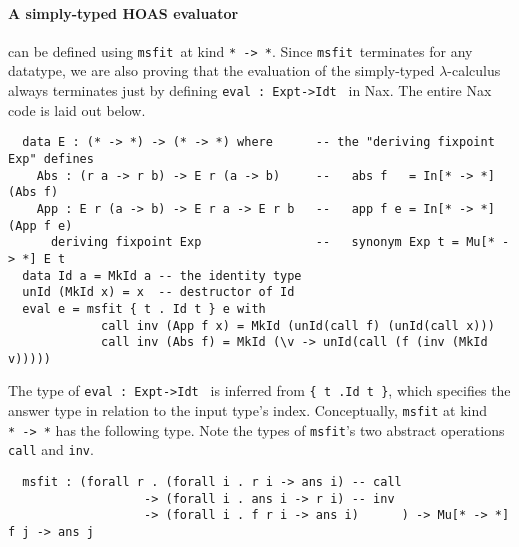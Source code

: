 \documentclass[a4paper]{easychair} %
\newcommand{\msfit}[0]{\texttt{msfit}}
\begin{document}
\paragraph{A simply-typed HOAS evaluator\!\!\!} can be defined
using \msfit\ at kind \texttt{*\,->\,*}.  Since \msfit\ terminates
for any datatype, we are also proving that the evaluation of
the simply-typed $\lambda$-calculus always terminates
just by defining \texttt{eval\,:\,Exp\;t\;->\;Id\;t\,} in Nax.
The entire Nax code is laid out below.
\vspace*{-1ex}
{\small
\begin{verbatim}
  data E : (* -> *) -> (* -> *) where      -- the "deriving fixpoint Exp" defines
    Abs : (r a -> r b) -> E r (a -> b)     --   abs f   = In[* -> *] (Abs f)
    App : E r (a -> b) -> E r a -> E r b   --   app f e = In[* -> *] (App f e)
      deriving fixpoint Exp                --   synonym Exp t = Mu[* -> *] E t
  data Id a = MkId a -- the identity type
  unId (MkId x) = x  -- destructor of Id
  eval e = msfit { t . Id t } e with
             call inv (App f x) = MkId (unId(call f) (unId(call x)))
             call inv (Abs f) = MkId (\v -> unId(call (f (inv (MkId v)))))
\end{verbatim} }
\vspace*{-.5ex}
\noindent
The type of \texttt{eval\,:\,Exp\;t\;->\;Id\;t\,} is inferred from
\texttt{\{\,t\,.\;Id t\,\}}, which specifies the answer type in relation
to the input type's index.
Conceptually, \texttt{msfit} at kind \texttt{*\,->\,*} has the following type.
Note the types of \texttt{msfit}'s two abstract operations
\texttt{call} and \texttt{inv}.\vspace*{-.5ex}
{\small
\begin{verbatim}
  msfit : (forall r . (forall i . r i -> ans i) -- call
                   -> (forall i . ans i -> r i) -- inv
                   -> (forall i . f r i -> ans i)      ) -> Mu[* -> *] f j -> ans j
\end{verbatim} }
\vspace*{-2.5ex}
\end{document}
